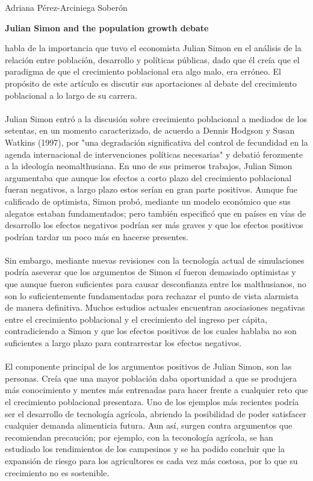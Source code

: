 \documentclass[11pt,spanish,letterpaper]{article}
\theoremstyle{plain}
\begin{document}
\begin{flushleft}
Adriana P\'erez-Arciniega Sober\'on
\end{flushleft}
\begin{center}
\textbf{Julian Simon and the population growth debate}
\end{center}
\cite{ahlburg1998julian} habla de la importancia que tuvo el economista Julian Simon en el an\'alisis de la relaci\'on entre poblaci\'on, desarrollo y pol\'iticas p\'ublicas, dado que \'el cre\'ia que el paradigma de que el crecimiento poblacional era algo malo, era err\'oneo. El prop\'osito de este art\'iculo es discutir sus aportaciones al debate del crecimiento poblacional a lo largo de su carrera.\\
\\
Julian Simon entr\'o a la discusi\'on sobre crecimiento poblacional a mediados de los setentas, en un momento caracterizado, de acuerdo a Dennis Hodgson y Susan Watkins (1997), por "una degradaci\'on significativa del control de fecundidad en la agenda internacional de intervenciones pol\'iticas necesarias" y debati\'o ferozmente a la ideolog\'ia neomalthusiana. En uno de sus primeros trabajos, Julian Simon argumentaba que aunque los efectos a corto plazo del crecimiento poblacional fueran negativos, a largo plazo estos ser\'ian en gran parte positivos. Aunque fue calificado de optimista, Simon prob\'o, mediante un modelo econ\'omico que sus alegatos estaban fundamentados; pero tambi\'en especific\'o que en pa\'ises en v\'ias de desarrollo los efectos negativos podr\'ian ser m\'as graves y que los efectos positivos podr\'ian tardar un poco m\'as en hacerse presentes. \\
\\
Sin embargo, mediante nuevas revisiones con la tecnolog\'ia actual de simulaciones podr\'ia aseverar que los argumentos de Simon s\'i fueron demasiado optimistas y que aunque fueron suficientes para causar desconfianza entre los malthusianos, no son lo suficientemente fundamentadas para rechazar el punto de vista alarmista de manera definitiva. Muchos estudios actuales encuentran asociasiones negativas entre el crecimiento poblacional y el crecimiento del ingreso per c\'apita, contradiciendo a Simon y que los efectos positivos de los cuales hablaba no son suficientes a largo plazo para contrarrestar los efectos negativos.\\
\\
El componente principal de los argumentos positivos de Julian Simon, son las personas. Cre\'ia que una mayor poblaci\'on daba oportunidad a que se produjera m\'as conocimiento y mentes m\'as entrenadas para hacer frente a cualquier reto que el crecimiento poblacional presentara. Uno de los ejemplos m\'as recientes podr\'ia ser el desarrollo de tecnolog\'ia agr\'icola, abriendo la posibilidad de poder satisfacer cualquier demanda alimenticia futura. Aun as\'i, surgen contra argumentos que recomiendan precauci\'on; por ejemplo, con la teconolog\'ia agr\'icola, se han estudiado los rendimientos de los campesinos y se ha podido concluir que la expansi\'on de riesgo para los agricultores es cada vez m\'as costosa, por lo que su crecimiento no es sostenible.\\
\end{document}
